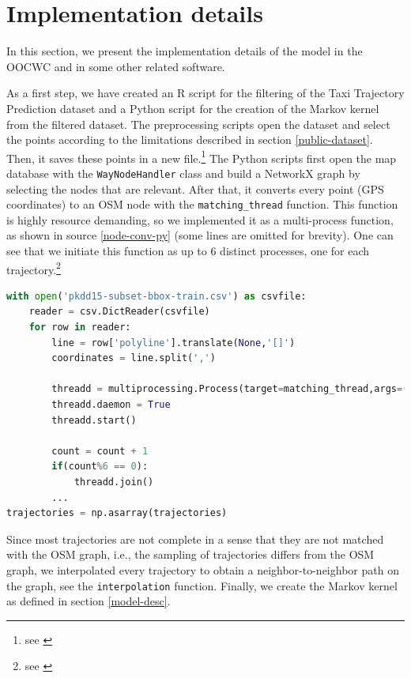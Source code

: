 \documentclass[b5paper,12pt]{report}
\theoremstyle{definition}
\begin{document}
\section{Implementation details}

In this section, we present the implementation details of the model in the OOCWC and in some other related software.

As a first step, we have created an R script for the filtering of the Taxi Trajectory Prediction dataset and a Python script for the creation of the Markov kernel from the filtered dataset. The preprocessing scripts open the dataset and select the points according to the limitations described in section \ref{public-dataset}. Then, it saves these points in a new file.\footnote{see \cite[/model-sources/Preprocessing]{csts-repo}} The Python scripts first open the map database with the \texttt{WayNodeHandler} class and build a NetworkX graph by selecting the nodes that are relevant. After that, it converts every point (GPS coordinates) to an OSM node with the \texttt{matching\_thread} function. This function is highly resource demanding, so we implemented it as a multi-process function, as shown in source \ref{node-conv-py} (some lines are omitted for brevity). One can see that we initiate this function as up to 6 distinct processes, one for each trajectory.\footnote{see \cite[/model-sources/Markovkernel]{csts-repo}}

\begin{lstlisting}[language=Python,caption=Multi-process processing of node conversion., label=node-conv-py, escapechar={|}]
with open('pkdd15-subset-bbox-train.csv') as csvfile:
    reader = csv.DictReader(csvfile)
    for row in reader:
        line = row['polyline'].translate(None,'[]')
        coordinates = line.split(',')
        
        threadd = multiprocessing.Process(target=matching_thread,args=(coordinates,))
        threadd.daemon = True
        threadd.start()
        
        count = count + 1
        if(count%6 == 0):
            threadd.join()
        ...
trajectories = np.asarray(trajectories)
\end{lstlisting}

Since most trajectories are not complete in a sense that they are not matched with the OSM graph, i.e., the sampling of trajectories differs from the OSM graph, we interpolated every trajectory to obtain a neighbor-to-neighbor path on the graph, see the \texttt{interpolation} function. Finally, we create the Markov kernel as defined in section \ref{model-desc}.
\end{document}
